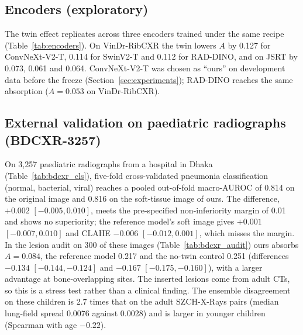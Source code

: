 \subsection{Encoders (exploratory)}
The twin effect replicates across three encoders trained under the same recipe (Table~\ref{tab:encoders}). On VinDr-RibCXR the twin lowers
$A$ by 0.127 for ConvNeXt-V2-T, 0.114 for SwinV2-T and 0.112 for RAD-DINO, and on JSRT by 0.073, 0.061 and 0.064. ConvNeXt-V2-T was chosen
as ``ours'' on development data before the freeze (Section~\ref{sec:experiments}); RAD-DINO reaches the same absorption ($A=0.053$ on
VinDr-RibCXR).
\begin{table}[htbp]
\centering\small
\caption{Twin regulariser per encoder (exploratory): absorption difference to the matched no-twin control and its interaction with bone
overlap.}
\label{tab:encoders}
\end{table}

\subsection{External validation on paediatric radiographs (BDCXR-3257)}
\label{sec:bdcxr}
On 3,257 paediatric radiographs from a hospital in Dhaka (Table~\ref{tab:bdcxr_cls}), five-fold cross-validated pneumonia classification
(normal, bacterial, viral) reaches a pooled out-of-fold macro-AUROC of 0.814 on the original image and 0.816 on the soft-tissue image of
ours. The difference, $+0.002$ $[-0.005,0.010]$, meets the pre-specified non-inferiority margin of 0.01 and shows no superiority; the
reference model's soft image gives $+0.001$ $[-0.007,0.010]$ and CLAHE $-0.006$ $[-0.012,0.001]$, which misses the margin. In the lesion audit
on 300 of these images (Table~\ref{tab:bdcxr_audit}) ours absorbs $A=0.084$, the reference model 0.217 and the no-twin control 0.251
(differences $-0.134$ $[-0.144,-0.124]$ and $-0.167$ $[-0.175,-0.160]$), with a larger advantage at bone-overlapping sites. The inserted
lesions come from adult CTs, so this is a stress test rather than a clinical finding. The ensemble disagreement on these children is 2.7 times
that on the adult SZCH-X-Rays pairs (median lung-field spread 0.0076 against 0.0028) and is larger in younger children (Spearman with age
$-0.22$).
\begin{table}[htbp]
\centering\small
\caption{BDCXR-3257: pneumonia classification (normal, bacterial, viral), five folds over near-duplicate groups $\times$ three seeds;
pooled out-of-fold macro-AUROC, per-fold mean $\pm$ SD and the difference to the original image (group bootstrap).}
\label{tab:bdcxr_cls}
\end{table}
\begin{table}[htbp]
\centering\small
\caption{BDCXR-3257: lesion audit on a fixed class-stratified subset of 300 images (1,800 sites).}
\label{tab:bdcxr_audit}
\end{table}
